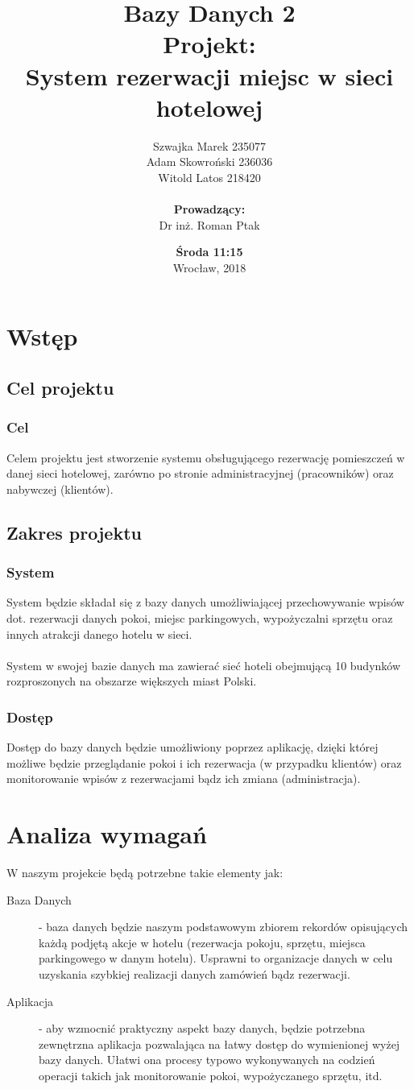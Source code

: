 \documentclass[]{article}
\title{ \textbf{\huge{Bazy Danych 2} \\ \bigskip Projekt:\\ System rezerwacji miejsc w sieci hotelowej} }
\author{Szwajka Marek 235077 \\  Adam Skowroński 236036 \\  Witold Latos 218420 \\ \bigskip \\ \textbf{\LARGE{Prowadzący:}} \\ Dr inż. Roman Ptak }
\date{\textbf{\LARGE{Środa 11:15}} \\ \bigskip  Wrocław, 2018}
\begin{document}
		\maketitle
	\newpage 
	\section{Wstęp}
	\subsection{Cel projektu}
	\subsubsection{Cel}
	Celem projektu jest stworzenie systemu obsługującego rezerwację pomieszczeń w danej sieci hotelowej, zarówno po stronie administracyjnej (pracowników) oraz nabywczej (klientów). 
	\subsection{Zakres projektu}
	\subsubsection{System}
	System będzie składał się z bazy danych umożliwiającej przechowywanie wpisów dot. rezerwacji danych pokoi, miejsc parkingowych, wypożyczalni sprzętu oraz innych atrakcji danego hotelu w sieci. \\ \\
	System w swojej bazie danych ma zawierać sieć hoteli obejmującą 10 budynków rozproszonych na obszarze większych miast Polski.
	\subsubsection{Dostęp}
	Dostęp do bazy danych będzie umożliwiony poprzez aplikację, dzięki której możliwe będzie przeglądanie pokoi i ich rezerwacja (w przypadku klientów) oraz monitorowanie wpisów z rezerwacjami bądz ich zmiana (administracja).
	\newpage
	\section{Analiza wymagań}
	W naszym projekcie będą potrzebne takie elementy jak:
	\begin{description} 
		\item[Baza Danych] - baza danych będzie naszym podstawowym zbiorem rekordów opisujących każdą podjętą akcje w hotelu (rezerwacja pokoju, sprzętu, miejsca parkingowego w danym hotelu). Usprawni to organizacje danych w celu uzyskania szybkiej realizacji danych zamówień bądz rezerwacji. 
		
		\item[Aplikacja] - aby wzmocnić praktyczny aspekt bazy danych, będzie potrzebna zewnętrzna aplikacja pozwalająca na łatwy dostęp do wymienionej wyżej bazy danych. Ułatwi ona procesy typowo wykonywanych na codzień operacji takich jak monitorowanie pokoi, wypożyczanego sprzętu, itd.
	\end{description}
\end{document}
